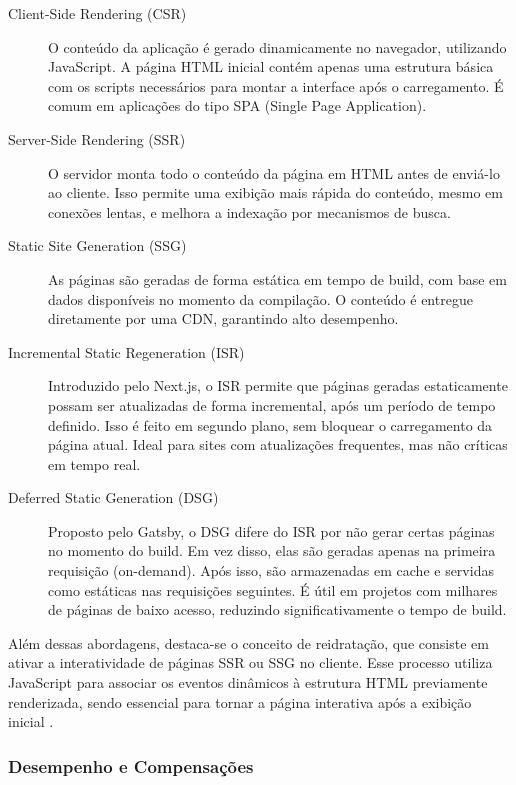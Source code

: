 \begin{description}
  \item[Client-Side Rendering (CSR)] 
  O conteúdo da aplicação é gerado dinamicamente no navegador, utilizando JavaScript. A página HTML inicial contém apenas uma estrutura básica com os scripts necessários para montar a interface após o carregamento. É comum em aplicações do tipo SPA (Single Page Application).
  
  \item[Server-Side Rendering (SSR)]
  O servidor monta todo o conteúdo da página em HTML antes de enviá-lo ao cliente. Isso permite uma exibição mais rápida do conteúdo, mesmo em conexões lentas, e melhora a indexação por mecanismos de busca.

  \item[Static Site Generation (SSG)]
  As páginas são geradas de forma estática em tempo de build, com base em dados disponíveis no momento da compilação. O conteúdo é entregue diretamente por uma CDN, garantindo alto desempenho.

  \item[Incremental Static Regeneration (ISR)]
  Introduzido pelo Next.js, o ISR permite que páginas geradas estaticamente possam ser atualizadas de forma incremental, após um período de tempo definido. Isso é feito em segundo plano, sem bloquear o carregamento da página atual. Ideal para sites com atualizações frequentes, mas não críticas em tempo real.

  \item[Deferred Static Generation (DSG)]
  Proposto pelo Gatsby, o DSG difere do ISR por não gerar certas páginas no momento do build. Em vez disso, elas são geradas apenas na primeira requisição (on-demand). Após isso, são armazenadas em cache e servidas como estáticas nas requisições seguintes. É útil em projetos com milhares de páginas de baixo acesso, reduzindo significativamente o tempo de build.
\end{description}

Além dessas abordagens, destaca-se o conceito de reidratação, que consiste em ativar a interatividade de páginas SSR ou SSG no cliente. Esse processo utiliza JavaScript para associar os eventos dinâmicos à estrutura HTML previamente renderizada, sendo essencial para tornar a página interativa após a exibição inicial \cite{osmani2025}.


\subsubsection{Desempenho e Compensações}

